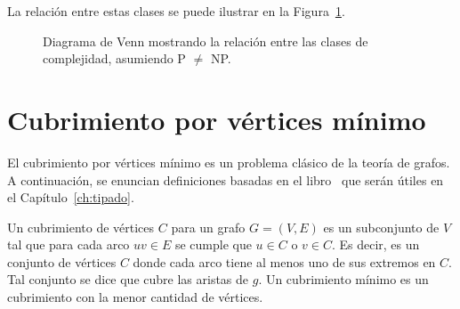La relación entre estas clases se puede ilustrar en la Figura~\ref{fig:pnp}.
\begin{figure}[H]
    \centering
    \caption{Diagrama de Venn mostrando la relación entre las clases de complejidad, asumiendo P $\neq$ NP.}
    \label{fig:pnp}
\end{figure}

\section{Cubrimiento por vértices mínimo}
El cubrimiento por vértices mínimo es un problema clásico de la teoría de grafos. A continuación, se enuncian definiciones basadas en el libro~\cite{vertex_cover} que serán útiles en el Capítulo~\ref{ch:tipado}.

\begin{definicion}\label{def:min_cover}
Un cubrimiento de vértices $C$ para un grafo $G=(V,E)$ es un subconjunto de $V$ tal que para cada arco $uv \in E$ se cumple que $u \in C$ o $v \in C$. Es decir, es un conjunto de vértices $C$ donde cada arco tiene al menos uno de sus extremos en $C$. Tal conjunto se dice que cubre las aristas de $g$. Un cubrimiento mínimo es un cubrimiento con la menor cantidad de vértices.
\end{definicion}


